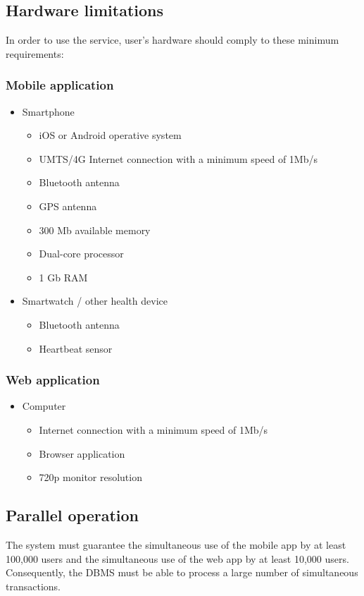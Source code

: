 \subsection{Hardware limitations}\label{hardwareLimitation}
In order to use the service, user’s hardware should comply to these minimum requirements:
\subsubsection{Mobile application}
\begin{itemize}
  \item Smartphone
  \begin{itemize}
    \item iOS or Android operative system
    \item UMTS/4G Internet connection with a minimum speed of 1Mb/s
    \item Bluetooth antenna
    \item GPS antenna
    \item 300 Mb available memory
    \item Dual-core processor
    \item 1 Gb RAM
  \end{itemize}
  \item Smartwatch / other health device
  \begin{itemize}
    \item Bluetooth antenna
    \item Heartbeat sensor
  \end{itemize}
\end{itemize}

\subsubsection{Web application}
\begin{itemize}
  \item Computer
  \begin{itemize}
    \item Internet connection with a minimum speed of 1Mb/s
    \item Browser application
    \item 720p monitor resolution
  \end{itemize}
\end{itemize}

\subsection{Parallel operation}
The system must guarantee the simultaneous use of the mobile app by at least 100,000 users and the simultaneous use of the web app by at least 10,000 users.
Consequently, the DBMS must be able to process a large number of simultaneous transactions.


